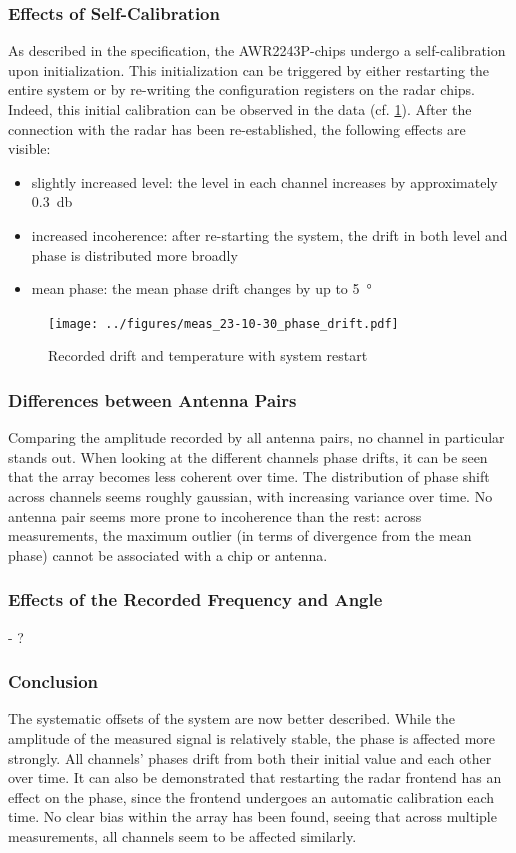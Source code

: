 \subsubsection*{Effects of Self-Calibration}
As described in the specification, the AWR2243P-chips undergo a self-calibration upon initialization.
This initialization can be triggered by either restarting the entire system or by re-writing the configuration registers on the radar chips.
Indeed, this initial calibration can be observed in the data (cf. \ref{fig:restart}).
After the connection with the radar has been re-established, the following effects are visible:
\begin{itemize}
    \item slightly increased level: the level in each channel increases by approximately \SI{0.3}{\decibel}
    \item increased incoherence: after re-starting the system, the drift in both level and phase is distributed more broadly
    \item mean phase: the mean phase drift changes by up to \SI{5}{\degree}
\end{itemize}

\begin{figure}
    \centering
    \texttt{[image: ../figures/meas\_23-10-30\_phase\_drift.pdf]}
    \caption{Recorded drift and temperature with system restart}
    \label{fig:restart}
\end{figure}


\subsubsection*{Differences between Antenna Pairs}
Comparing the amplitude recorded by all antenna pairs, no channel in particular stands out.
When looking at the different channels phase drifts, it can be seen that the array becomes less coherent over time.
The distribution of phase shift across channels seems roughly gaussian, with increasing variance over time.
No antenna pair seems more prone to incoherence than the rest:
across measurements, the maximum outlier (in terms of divergence from the mean phase) cannot be associated with a chip or antenna.

\subsubsection*{Effects of the Recorded Frequency and Angle}
- ?
\subsubsection*{Conclusion}
The systematic offsets of the system are now better described.
While the amplitude of the measured signal is relatively stable, the phase is affected more strongly.
All channels' phases drift from both their initial value and each other over time.
It can also be demonstrated that restarting the radar frontend has an effect on the phase, since the frontend undergoes an automatic calibration each time.
No clear bias within the array has been found, seeing that across multiple measurements, all channels seem to be affected similarly.

